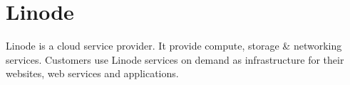 \section{Linode}

Linode is a cloud service provider. It provide compute, storage \& networking services. Customers use Linode services on demand as infrastructure for their websites, web services and applications.\cites{hid-sp18-511-linode}

